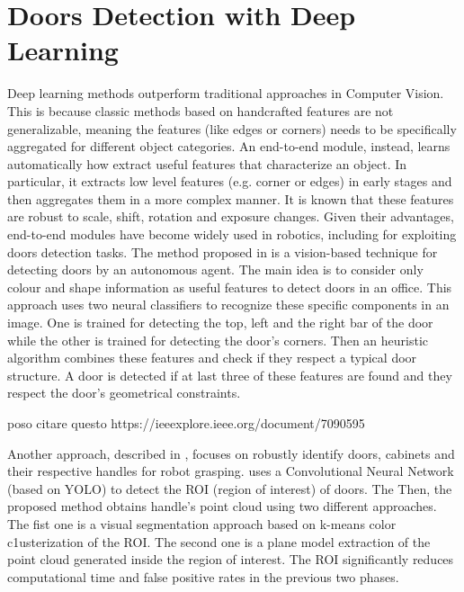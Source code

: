 \section{Doors Detection with Deep Learning} 
 Deep learning methods outperform traditional approaches in Computer Vision. This is because classic methods based on handcrafted features are not generalizable, meaning the features (like edges or corners) needs to be specifically aggregated for different object categories. An end-to-end module, instead, learns automatically how extract useful features that characterize an object. In particular, it extracts low level features (e.g. corner or edges) in early stages and then aggregates them in a more complex manner. It is known that these features are robust to scale, shift, rotation and exposure changes. Given their advantages, end-to-end modules have become widely used in robotics, including for exploiting doors detection tasks. The method proposed in \cite{detectdoorsfeature} is a vision-based technique for detecting doors by an autonomous agent. The main idea is to consider only colour and shape information as useful features to detect doors in an office. This approach uses two neural classifiers to recognize these specific components in an image. One is trained for detecting the top, left and the right bar of the door while the other is trained for detecting the door's corners. Then an heuristic algorithm combines these features and check if they respect a typical door structure. A door is detected if at last three of these features are found and they respect the door's geometrical constraints.
 
 poso citare questo https://ieeexplore.ieee.org/document/7090595
 
 Another approach, described in \cite{doorcabinet}, focuses on robustly identify doors, cabinets and their respective handles for robot grasping. \citeauthor{doorcabinet} uses a Convolutional Neural Network (based on YOLO) to detect the ROI (region of interest) of doors. The Then, the proposed method obtains handle's point cloud using two different approaches. The fist one is a visual segmentation approach based on k-means color c1usterization of the ROI. The second one is a plane model extraction of the point cloud generated inside the region of interest. The ROI significantly reduces computational time and false positive rates in the previous two phases.
 

 